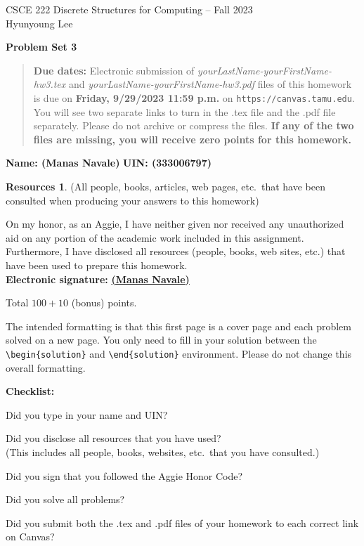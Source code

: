 \documentclass{article}
\theoremstyle{definition}
\newtheorem*{solution}{Solution}
\newtheorem*{resources}{Resources}
\newcommand{\name}[2]{\noindent\textbf{Name: #1}\hfill \textbf{UIN: #2}
  \newcommand{\myName}{#1}
  \newcommand{\myUIN}{#2}
}
\newcommand{\honor}{\noindent On my honor, as an Aggie, I have neither
  given nor received any unauthorized aid on any portion of the
  academic work included in this assignment. Furthermore, I have
  disclosed all resources (people, books, web sites, etc.) that have
  been used to prepare this homework. \\[2ex]
 \textbf{Electronic signature:} \underline{ \textbf{(Manas Navale)} } } %
\newcommand{\checklist}{\noindent\textbf{Checklist:}
\begin{compactitem}[$\Box$] 
\item Did you type in your name and UIN? 
\item Did you disclose all resources that you have used? \\
(This includes all people, books, websites, etc.\ that you have consulted.)
\item Did you sign that you followed the Aggie Honor Code? 
\item Did you solve all problems? 
\item Did you submit both the .tex and .pdf files of your homework to each correct link on Canvas? 
\end{compactitem}
}
\newcommand{\problemset}[1]{\begin{center}\textbf{Problem Set #1}\end{center}}
\newcommand{\duedate}[1]{\begin{quote}\textbf{Due dates:} Electronic
    submission of \textsl{yourLastName-yourFirstName-hw3.tex} and 
    \textsl{yourLastName-yourFirstName-hw3.pdf} files of this homework is due on
    \textbf{#1} on \texttt{https://canvas.tamu.edu}. You will see two separate links
    to turn in the .tex file and the .pdf file separately. Please do not archive or compress the files.  
    \textbf{If any of the two files are missing, you will receive zero points for this homework.}\end{quote} }
\begin{document}
\begin{center}
{\large
CSCE 222 Discrete Structures for Computing -- Fall 2023\\[.5ex]
Hyunyoung Lee\\}
\end{center}
\problemset{3}
\duedate{Friday, 9/29/2023 11:59 p.m.}
\name{ (Manas Navale) }{ (333006797) }  %

\begin{resources} (All people, books, articles, web pages, etc.\ that
  have been consulted when producing your answers to this homework)
\end{resources}
\honor

\bigskip

\noindent
Total $100+10$ (bonus) points.

\bigskip

\noindent
The intended formatting is that this first page is a cover page and each 
problem solved on a new page. You only need to fill in your solution between 
the \verb|\begin{solution}| and \verb|\end{solution}| environment.  
Please do not change this overall formatting.

\vfill
\checklist
\end{document}
